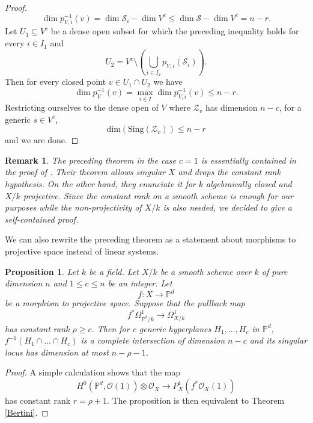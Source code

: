\documentclass[a4paper,12pt]{amsart}
\newtheorem{proposition}[definition]{Proposition}
\newtheorem{remark}[definition]{Remark}
\numberwithin{equation}{section}
\renewcommand{\leq}{\leqslant}
\renewcommand{\geq}{\geqslant}
\renewcommand{\_}{\rule{0.25cm}{0.4pt}}
\begin{document}
\begin{proof}
    \[
    \dim p_{V,i}^{-1}(v)=\dim \mathcal{S}_{i}-\dim V^{c}\leq \dim \mathcal{S}-\dim V^{c}=n-r.
    \]
    Let $U_{1}\subseteq V^{c}$ be a dense open subset for which the preceding inequality holds for every $i\in I_{1}$ and
    \[
    U_{2}=V^{c}\setminus(\bigcup_{i\in I_{2}} \overline{p_{V,i}(\mathcal{S}_{i})}).
    \]
    Then for every closed point $v\in U_{1}\cap U_{2}$ we have
    \[
    \dim p_{V}^{-1}(v)= \max_{i\in I}\dim p_{V,i}^{-1}(v)\leq n-r.
    \]
    Restricting ourselves to the dense open of $V$ where $\mathcal{Z}_{v}$ has dimension $n-c$, for a generic $s\in V^{c}$,
    \[
    \text{dim}(\text{Sing}(\mathcal{Z}_{v}))\leq n-r
    \]
    and we are done.
\end{proof}

\begin{remark}
The preceding theorem in the case $c=1$ is essentially contained in the proof of \cite[Theorem 2.2]{Biswas2024}. Their theorem allows singular $X$ and drops the constant rank hypothesis. On the other hand, they enunciate it for $k$ algebraically closed and $X/k$ projective. Since the constant rank on a smooth scheme is enough for our purposes while the non-projectivity of $X/k$ is also needed, we decided to give a self-contained proof.
\end{remark}

We can also rewrite the preceding theorem as a statement about morphisms to projective space instead of linear systems.

\begin{proposition}\label{Bertini 2}
    Let $k$ be a field. Let $X/k$ be a smooth scheme over $k$ of pure dimension $n$ and $1\leq c\leq n$ be an integer. Let
    \[
    f\colon X\to \mathbb{P}^{d}
    \]
    be a morphism to projective space. Suppose that the pullback map
    \[
    f^{\ast}\Omega^{1}_{\mathbb{P}^{d}/k}\to \Omega^{1}_{X/k}
    \]
    has constant rank $\rho\geq c$. Then for $c$ generic hyperplanes $H_{1},\dots, H_{c}$ in $\mathbb{P}^{d}$, $f^{-1}(H_{1}\cap\dots\cap H_{c})$ is a complete intersection of dimension $n-c$ and its singular locus has dimension at most $n-\rho-1$.
\end{proposition}
\begin{proof}
    A simple calculation shows that the map
    \[
    H^{0}(\mathbb{P}^{d},\mathcal{O}(1))\otimes \mathcal{O}_{X}\to P^{1}_{X}(f^{\ast}\mathcal{O}_{X}(1))
    \]
    has constant rank $r=\rho+1$. The proposition is then equivalent to Theorem \ref{Bertini}.
\end{proof}
\end{document}
